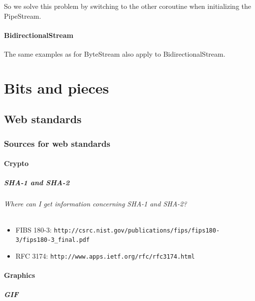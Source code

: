 \documentclass[10pt]{scrbook}
\begin{document}
So we solve this problem by switching to the other coroutine when initializing the PipeStream.

\subsection{BidirectionalStream}

The same examples as for ByteStream also apply to BidirectionalStream.

\part{Bits and pieces}

\chapter{Web standards}

\section{Sources for web standards}

\subsection{Crypto}

\subsubsection{SHA-1 and SHA-2}

\paragraph{Where can I get information concerning SHA-1 and SHA-2?}
\begin{itemize}
\item FIBS 180-3: \verb|http://csrc.nist.gov/publications/fips/fips180-3/fips180-3_final.pdf|
\item RFC 3174: \verb|http://www.apps.ietf.org/rfc/rfc3174.html|
\end{itemize}

\subsection{Graphics}

\subsubsection{GIF}
\end{document}
